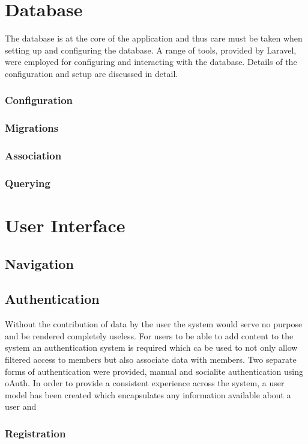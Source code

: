 \section{Database}
The database is at the core of the application and thus care must be taken when setting up and configuring the database. A range of tools, provided by Laravel, were employed for configuring and interacting with the database. Details of the configuration and setup are discussed in detail.

\subsubsection{Configuration}
\subsubsection{Migrations}
\subsubsection{Association}
\subsubsection{Querying}

\section{User Interface}
\subsection{Navigation}

\subsection{Authentication}
Without the contribution of data by the user the system would serve no purpose and be rendered completely useless. For users to be able to add content to the system an authentication system is required which ca be used to not only allow filtered access to members but also associate data with members. Two separate forms of authentication were provided, manual and socialite authentication using oAuth. In order to provide a consistent experience across the system, a user model has been created which encapsulates any information available about  a user and 

\subsubsection{Registration}
